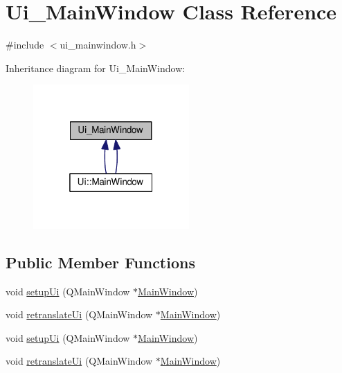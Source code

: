 \hypertarget{class_ui___main_window}{}\section{Ui\+\_\+\+Main\+Window Class Reference}
\label{class_ui___main_window}


{\ttfamily \#include $<$ui\+\_\+mainwindow.\+h$>$}



Inheritance diagram for Ui\+\_\+\+Main\+Window\+:
\nopagebreak
\begin{figure}[H]
\begin{center}
\leavevmode
\includegraphics[width=169pt]{class_ui___main_window__inherit__graph}
\end{center}
\end{figure}
\subsection*{Public Member Functions}
\begin{DoxyCompactItemize}
\item 
void \hyperlink{class_ui___main_window_acf4a0872c4c77d8f43a2ec66ed849b58}{setup\+Ui} (Q\+Main\+Window $\ast$\hyperlink{class_main_window}{Main\+Window})
\item 
void \hyperlink{class_ui___main_window_a097dd160c3534a204904cb374412c618}{retranslate\+Ui} (Q\+Main\+Window $\ast$\hyperlink{class_main_window}{Main\+Window})
\item 
void \hyperlink{class_ui___main_window_acf4a0872c4c77d8f43a2ec66ed849b58}{setup\+Ui} (Q\+Main\+Window $\ast$\hyperlink{class_main_window}{Main\+Window})
\item 
void \hyperlink{class_ui___main_window_a097dd160c3534a204904cb374412c618}{retranslate\+Ui} (Q\+Main\+Window $\ast$\hyperlink{class_main_window}{Main\+Window})
\end{DoxyCompactItemize}
